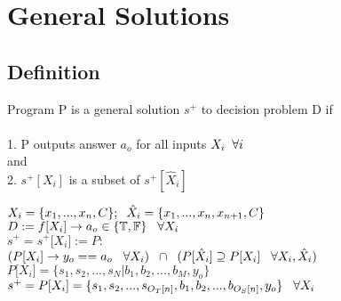 \documentclass[11pt]{article}
\begin{document}
\section{General Solutions}

\subsection{Definition}
Program P is a general solution $s^{+}$ to decision problem D if \\\\
1. P outputs answer $a_o$ for all inputs $X_i \hspace{2mm} \forall i$\\
and \\
2. $s^{+}[X_i]$ is a subset of $s^{+}[\hat{X}_i]$
\begin{center}
\vspace{2mm}
$
X_i = \{x_1,...,x_n,C\}; \hspace{2mm} \hat{X}_i = \{x_1,...,x_n,x_{n+1},C\}
$
\\ \vspace{2mm}
$
D := f \lbrack X_i \rbrack \rightarrow a_{o} \in \{\mathbb{T}, \mathbb{F}\} \hspace{3mm} \forall X_i
$
\\ \vspace{2mm}
$
s^+ = s^+\lbrack X_i \rbrack := P :
$
\\ \vspace{2mm}
$
(P \lbrack X_i \rbrack \rightarrow y_{o} == a_{o} \hspace{3mm} \forall X_i) \hspace{2mm} \cap \hspace{2mm} (P[\hat{X}_i] \supseteq P[X_i] \hspace{3mm} \forall X_i,\hat{X}_i)
$
\\ \vspace{4mm}
$
P \lbrack X_i \rbrack = \{ s_1,s_2,...,s_N| b_1, b_2,...,b_M,y_o\}
$
\\ \vspace{3mm}
$
s^+ = P \lbrack X_i \rbrack = \{ s_1,s_2,...,s_{O_T \lbrack n \rbrack }, b_1, b_2,...,b_{O_S \lbrack n \rbrack},y_o \} \hspace{3mm} \forall X_i
$
\end{center}
\end{document}
